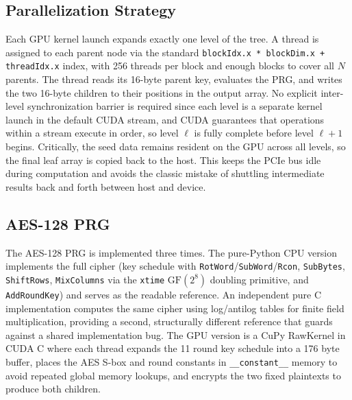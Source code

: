 \documentclass[conference]{IEEEtran}
\begin{document}
\subsection{Parallelization Strategy}
Each GPU kernel launch expands exactly one level of the tree. A thread is assigned to each parent node via the standard \texttt{blockIdx.x * blockDim.x + threadIdx.x} index, with 256 threads per block and enough blocks to cover all $N$ parents. The thread reads its 16-byte parent key, evaluates the PRG, and writes the two 16-byte children to their positions in the output array. No explicit inter-level synchronization barrier is required since each level is a separate kernel launch in the default CUDA stream, and CUDA guarantees that operations within a stream execute in order, so level $\ell$ is fully complete before level $\ell{+}1$ begins. Critically, the seed data remains resident on the GPU across all levels, so the final leaf array is copied back to the host. This keeps the PCIe bus idle during computation and avoids the classic mistake of shuttling intermediate results back and forth between host and device.

\subsection{AES-128 PRG}
The AES-128 PRG is implemented three times. The pure-Python CPU version implements the full cipher (key schedule with \texttt{RotWord}/\texttt{SubWord}/\texttt{Rcon}, \texttt{SubBytes}, \texttt{ShiftRows}, \texttt{MixColumns} via the \texttt{xtime} $\mathrm{GF}(2^8)$ doubling primitive, and \texttt{AddRoundKey}) and serves as the readable reference. An independent pure C implementation computes the same cipher using log/antilog tables for finite field multiplication, providing a second, structurally different reference that guards against a shared implementation bug. The GPU version is a CuPy RawKernel in CUDA C where each thread expands the 11 round key schedule into a 176 byte buffer, places the AES S-box and round constants in \texttt{\_\_constant\_\_} memory to avoid repeated global memory lookups, and encrypts the two fixed plaintexts to produce both children.
\end{document}
